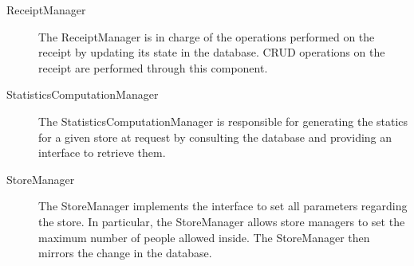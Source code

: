 \documentclass[../../main.tex]{subfiles}
\begin{document}
\begin{description}
    \item[ReceiptManager] The ReceiptManager is in charge of the operations performed on the receipt by updating its 
    state in the database. CRUD operations on the receipt are performed through this component.
    
    \item[StatisticsComputationManager]  The StatisticsComputationManager is responsible for 
    generating the statics for a given store at request by consulting the database and providing an interface to retrieve them.	  
     
    \item[StoreManager] The StoreManager implements the interface to set all parameters regarding the store. 
    In particular, the StoreManager allows store managers to set the maximum number of people allowed inside. 
    The StoreManager then mirrors the change in the database.
    
\end{description}
\end{document}
